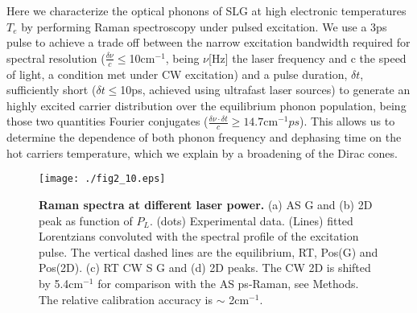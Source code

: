 \documentclass[aps, prl,twocolumn]{revtex4}
\begin{document}
Here we characterize the optical phonons of SLG at high electronic temperatures $T_e$ by performing Raman spectroscopy under pulsed excitation. We use a 3ps pulse to achieve a trade off between the
narrow excitation bandwidth required for spectral resolution ($\frac{\delta \nu}{c}\leq$10cm$^{-1}$, being $\nu$[Hz] the laser frequency and c the speed of light, a condition met under CW excitation) and a pulse duration, $\delta t$, sufficiently short ($\delta t\leq$10ps, achieved using ultrafast laser sources) to generate an highly excited carrier distribution over the equilibrium phonon population, being those two quantities Fourier conjugates\cite{papoulis_1962} ($\frac{\delta\nu \cdot\delta t}{c} \geq 14.7$cm$^{-1}ps$). This allows us to determine the dependence of both phonon frequency and dephasing time on the hot carriers temperature, which we explain by a broadening of the Dirac cones.


\begin{figure*}
	\centerline{\texttt{[image: ./fig2\_10.eps]}}
	\caption{\textbf{Raman spectra at different laser power.} (a) AS G and (b) 2D peak as function of $P_L$. (dots) Experimental data. (Lines) fitted Lorentzians convoluted with the spectral profile of the excitation pulse. The vertical dashed lines are the equilibrium, RT, Pos(G) and Pos(2D). (c) RT CW S G and (d) 2D peaks. The CW 2D is shifted by 5.4cm$^{-1}$ for comparison with the AS ps-Raman, see Methods. The relative calibration accuracy is $\sim$ 2cm$^{-1}$.}
	\label{fig2}
\end{figure*}
\end{document}
